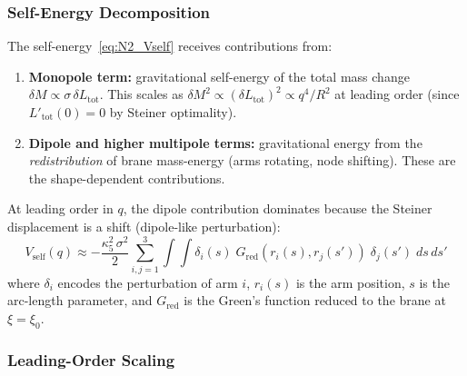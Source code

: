 \subsubsection{Self-Energy Decomposition}

The self-energy~\eqref{eq:N2_Vself} receives contributions from:
\begin{enumerate}
    \item \textbf{Monopole term:} gravitational self-energy of the
    total mass change $\delta M \propto \sigma\,\delta L_{\mathrm{tot}}$.
    This scales as $\delta M^2 \propto (\delta L_{\mathrm{tot}})^2
    \propto q^4/R^2$ at leading order (since $L'_{\mathrm{tot}}(0) = 0$
    by Steiner optimality).

    \item \textbf{Dipole and higher multipole terms:} gravitational
    energy from the \emph{redistribution} of brane mass-energy
    (arms rotating, node shifting). These are the shape-dependent
    contributions.
\end{enumerate}

At leading order in $q$, the dipole contribution dominates because
the Steiner displacement is a shift (dipole-like perturbation):
\begin{equation}
    V_{\mathrm{self}}(q) \approx -\frac{\kappa_5^2\,\sigma^2}{2}
    \sum_{i,j=1}^{3}\int\!\!\int \delta_i(s)\; G_{\mathrm{red}}(r_i(s), r_j(s'))\;
    \delta_j(s')\; ds\, ds'
    \label{eq:N2_Vself_arms}
\end{equation}
where $\delta_i$ encodes the perturbation of arm $i$, $r_i(s)$ is the
arm position, $s$ is the arc-length parameter, and $G_{\mathrm{red}}$
is the Green's function reduced to the brane at $\xi = \xi_0$.

\subsubsection{Leading-Order Scaling}

